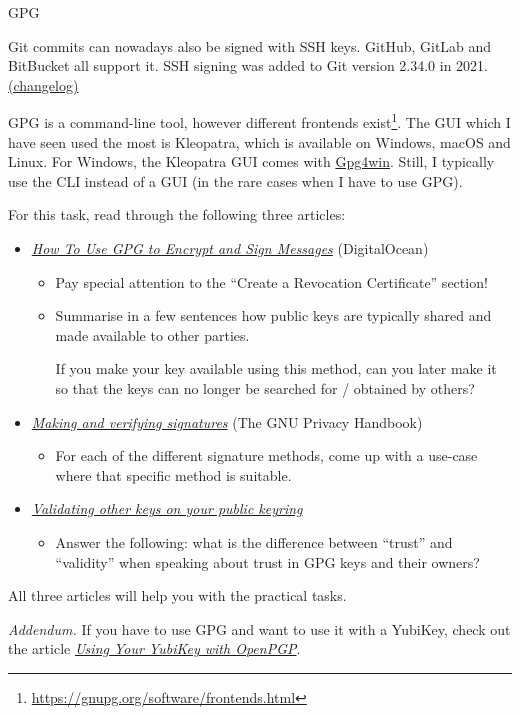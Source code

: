\documentclass{homework}
\begin{document}
\begin{task}{GPG}
  \begin{tcolorbox}
    Git commits can nowadays also be signed with SSH keys.
    GitHub, GitLab and BitBucket all support it.
    SSH signing was added to Git version 2.34.0 in 2021.
    \href{https://github.com/git/git/blob/master/Documentation/RelNotes/2.34.0.txt}{(changelog)}
  \end{tcolorbox}

  GPG is a command-line tool, however different frontends exist\footnote{\url{https://gnupg.org/software/frontends.html}}.
  The GUI which I have seen used the most is Kleopatra, which is available on Windows, macOS and Linux.
  For Windows, the Kleopatra GUI comes with \href{https://gpg4win.org/index.html}{Gpg4win}.
  Still, I typically use the CLI instead of a GUI (in the rare cases when I have to use GPG).

  For this task, read through the following three articles:
  \begin{itemize}
    \item \href{https://www.digitalocean.com/community/tutorials/how-to-use-gpg-to-encrypt-and-sign-messages}{\textit{How To Use GPG to Encrypt and Sign Messages}} (DigitalOcean)
    \begin{itemize}
      \item Pay special attention to the \enquote{Create a Revocation Certificate} section!
      \item Summarise in a few sentences how public keys are typically shared and made available to other parties.
      
      If you make your key available using this method, can you later make it so that the keys can no longer be searched for / obtained by others?
    \end{itemize}
    \item \href{https://www.gnupg.org/gph/en/manual/x135.html}{\textit{Making and verifying signatures}} (The GNU Privacy Handbook)
    \begin{itemize}
      \item For each of the different signature methods, come up with a use-case where that specific method is suitable.
    \end{itemize}

    \item \href{https://www.gnupg.org/gph/en/manual/x334.html}{\textit{Validating other keys on your public keyring}}
    \begin{itemize}
      \item Answer the following: what is the difference between \enquote{trust} and \enquote{validity} when speaking about trust in GPG keys and their owners?
    \end{itemize}
  \end{itemize}

  All three articles will help you with the practical tasks.

  \textit{Addendum.}
  If you have to use GPG and want to use it with a YubiKey, check out the article \href{https://support.yubico.com/hc/en-us/articles/360013790259-Using-Your-YubiKey-with-OpenPGP}{\textit{Using Your YubiKey with OpenPGP}}.
\end{task}
\end{document}
